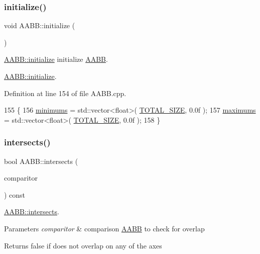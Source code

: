 \subsubsection{\texorpdfstring{initialize()}{initialize()}}
{\footnotesize\ttfamily void A\+A\+B\+B\+::initialize (\begin{DoxyParamCaption}{ }\end{DoxyParamCaption})\hspace{0.3cm}{\ttfamily [private]}}



\hyperlink{class_a_a_b_b_aa2a1a47dc45291be16276dd397bc78fe}{A\+A\+B\+B\+::initialize} initialize \hyperlink{class_a_a_b_b}{A\+A\+BB}. 

\hyperlink{class_a_a_b_b_aa2a1a47dc45291be16276dd397bc78fe}{A\+A\+B\+B\+::initialize}. 

Definition at line 154 of file A\+A\+B\+B.\+cpp.


\begin{DoxyCode}
155 \{
156     \hyperlink{class_a_a_b_b_aaf1ec35e5c0258cd57e65429f93c14a2}{minimums} = std::vector<float>( \hyperlink{class_a_a_b_b_a7ec2385af789441375335c09cff0709c}{TOTAL\_SIZE}, 0.0f );
157     \hyperlink{class_a_a_b_b_a1289c3a2e5c7a98f90d5bcdb8251a06f}{maximums} = std::vector<float>( \hyperlink{class_a_a_b_b_a7ec2385af789441375335c09cff0709c}{TOTAL\_SIZE}, 0.0f );
158 \}
\end{DoxyCode}
\mbox{\label{class_a_a_b_b_a62290d3f27644484f2df17c42cd1bfd5}} 
\subsubsection{\texorpdfstring{intersects()}{intersects()}}
{\footnotesize\ttfamily bool A\+A\+B\+B\+::intersects (\begin{DoxyParamCaption}\item[{\hyperlink{class_a_a_b_b}{A\+A\+BB}}]{comparitor }\end{DoxyParamCaption}) const}



\hyperlink{class_a_a_b_b_a62290d3f27644484f2df17c42cd1bfd5}{A\+A\+B\+B\+::intersects}. 


\begin{DoxyParams}{Parameters}
{\em comparitor} & comparison \hyperlink{class_a_a_b_b}{A\+A\+BB} to check for overlap \\
\hline
\end{DoxyParams}
\begin{DoxyReturn}{Returns}
false if does not overlap on any of the axes 
\end{DoxyReturn}



